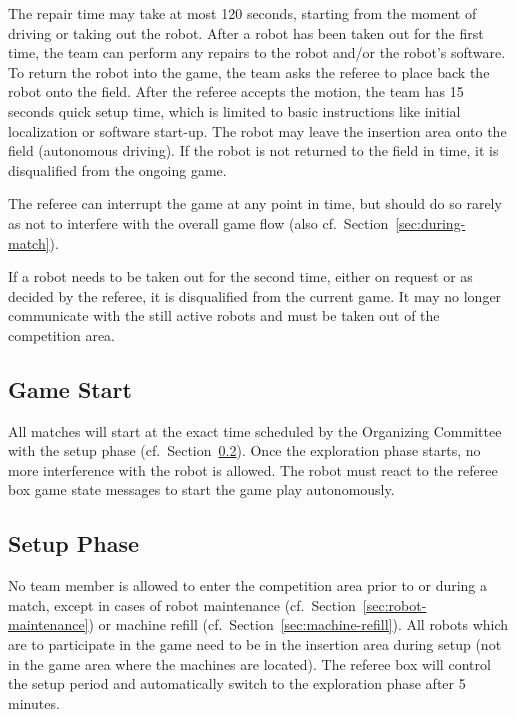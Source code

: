 \documentclass[12pt,twoside]{article}
\newcommand{\refsec}[1]{Section~\ref{#1}}
\begin{document}
The repair time may take at most 120 seconds, starting from the moment
of driving or taking out the robot.  After a robot has been taken out
for the first time, the team can perform any repairs to the robot
and/or the robot's software. To return the robot into the game, the
team asks the referee to place back the robot onto the field. After
the referee accepts the motion, the team has 15 seconds quick setup
time, which is limited to basic instructions like initial localization
or software start-up. The robot may leave the insertion area onto the
field (autonomous driving). If the robot is not returned to the field
in time, it is disqualified from the ongoing game.

The referee can interrupt the game at any point in time, but should do
so rarely as not to interfere with the overall game flow (also
cf.~\refsec{sec:during-match}).

If a robot needs to be taken out for the second time, either on
request or as decided by the referee, it is disqualified from the
current game. It may no longer communicate with the still active
robots and must be taken out of the competition area.


\subsection{Game Start}
\label{sec:game-start}
%
All matches will start at the exact time scheduled by the Organizing
Committee with the setup phase (cf.~\refsec{sec:setup-phase}). Once
the exploration phase starts, no more interference with the robot is
allowed. The robot must react to the referee box game state messages
to start the game play autonomously.

\subsection{Setup Phase}
\label{sec:setup-phase}
No team member is allowed to enter the competition area prior to or
during a match, except in cases of robot maintenance
(cf.~\refsec{sec:robot-maintenance}) or machine refill
(cf.~\refsec{sec:machine-refill}).  All robots which are to
participate in the game need to be in the insertion area during setup
(not in the game area where the machines are located). The referee box
will control the setup period and automatically switch to the
exploration phase after 5 minutes.
\end{document}
